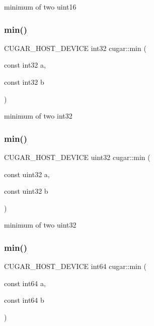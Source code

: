 minimum of two uint16 \mbox{\label{group___basic_gac0bc43a4d8949143dc20b3116d5065e7}} 
\subsubsection{\texorpdfstring{min()}{min()}\hspace{0.1cm}{\footnotesize\ttfamily [5/8]}}
{\footnotesize\ttfamily C\+U\+G\+A\+R\+\_\+\+H\+O\+S\+T\+\_\+\+D\+E\+V\+I\+CE int32 cugar\+::min (\begin{DoxyParamCaption}\item[{const int32}]{a,  }\item[{const int32}]{b }\end{DoxyParamCaption})\hspace{0.3cm}{\ttfamily [inline]}}

minimum of two int32 \mbox{\label{group___basic_ga4b5fa5961733ee2ad393a6c581d07c5d}} 
\subsubsection{\texorpdfstring{min()}{min()}\hspace{0.1cm}{\footnotesize\ttfamily [6/8]}}
{\footnotesize\ttfamily C\+U\+G\+A\+R\+\_\+\+H\+O\+S\+T\+\_\+\+D\+E\+V\+I\+CE uint32 cugar\+::min (\begin{DoxyParamCaption}\item[{const uint32}]{a,  }\item[{const uint32}]{b }\end{DoxyParamCaption})\hspace{0.3cm}{\ttfamily [inline]}}

minimum of two uint32 \mbox{\label{group___basic_ga3914d3facba77353216fbd68e3df1dac}} 
\subsubsection{\texorpdfstring{min()}{min()}\hspace{0.1cm}{\footnotesize\ttfamily [7/8]}}
{\footnotesize\ttfamily C\+U\+G\+A\+R\+\_\+\+H\+O\+S\+T\+\_\+\+D\+E\+V\+I\+CE int64 cugar\+::min (\begin{DoxyParamCaption}\item[{const int64}]{a,  }\item[{const int64}]{b }\end{DoxyParamCaption})\hspace{0.3cm}{\ttfamily [inline]}}

